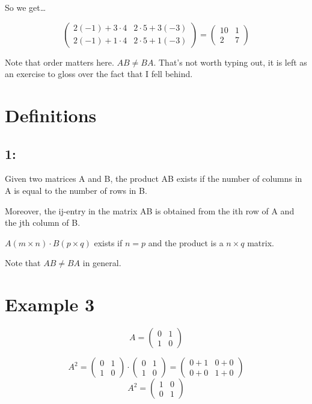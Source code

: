 \documentclass[a4paper]{article}
\begin{document}
So we get\ldots

\[
	\begin{pmatrix}
		2(-1)+3\cdot4 & 2\cdot5+3(-3) \\
		2(-1)+1\cdot4 & 2\cdot5+1(-3)
	\end{pmatrix} = 
	\begin{pmatrix}
		10 & 1 \\ 2 & 7
	\end{pmatrix}
\]

Note that order matters here. $AB \neq BA$. That's not worth typing out, it is left as an exercise to gloss over the fact that I fell behind.

\section*{Definitions}
\subsection*{1:}
Given two matrices A and B, the product AB exists if the number of columns in A is equal to the number of rows in B.

Moreover, the ij-entry in the matrix AB is obtained from the ith row of A and the jth column of B.

$A(m \times n) \cdot B(p \times q)$ exists if $n = p$ and the product is a $n \times q$ matrix.

Note that $AB \neq BA$ in general.

\section*{Example 3}
\[
A = 
\begin{pmatrix}
	0&1\\1&0
\end{pmatrix}
\]

\[
A^2 =
\begin{pmatrix}
	0&1\\1&0
\end{pmatrix}
\cdot
\begin{pmatrix}
	0&1\\1&0
\end{pmatrix}
=
\begin{pmatrix}
	0+1 & 0+0 \\ 0 + 0 & 1 + 0
\end{pmatrix}
\]
\[
A^2 = 
\begin{pmatrix}
	1&0\\0&1
\end{pmatrix}
\]
\end{document}
